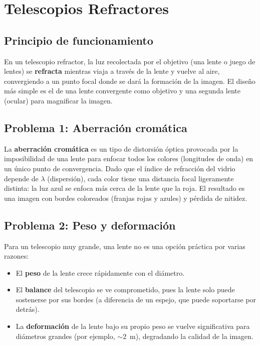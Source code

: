 

\section{Telescopios Refractores}

\subsection{Principio de funcionamiento}

En un telescopio refractor, la luz recolectada por el objetivo (una lente o juego de lentes) se \textbf{refracta} mientras viaja a través de la lente y vuelve al aire, convergiendo a un punto focal donde se dará la formación de la imagen. El diseño más simple es el de una lente convergente como objetivo y una segunda lente (ocular) para magnificar la imagen.



\subsection{Problema 1: Aberración cromática}

La \textbf{aberración cromática} es un tipo de distorsión óptica provocada por la imposibilidad de una lente para enfocar todos los colores (longitudes de onda) en un único punto de convergencia. Dado que el índice de refracción del vidrio depende de $\lambda$ (dispersión), cada color tiene una distancia focal ligeramente distinta: la luz azul se enfoca más cerca de la lente que la roja. El resultado es una imagen con bordes coloreados (franjas rojas y azules) y pérdida de nitidez.



\subsection{Problema 2: Peso y deformación}

Para un telescopio muy grande, una lente no es una opción práctica por varias razones:

\begin{itemize}
    \item El \textbf{peso} de la lente crece rápidamente con el diámetro.
    \item El \textbf{balance} del telescopio se ve comprometido, pues la lente solo puede sostenerse por sus bordes (a diferencia de un espejo, que puede soportarse por detrás).
    \item La \textbf{deformación} de la lente bajo su propio peso se vuelve significativa para diámetros grandes (por ejemplo, $\sim$2~m), degradando la calidad de la imagen.
\end{itemize}

